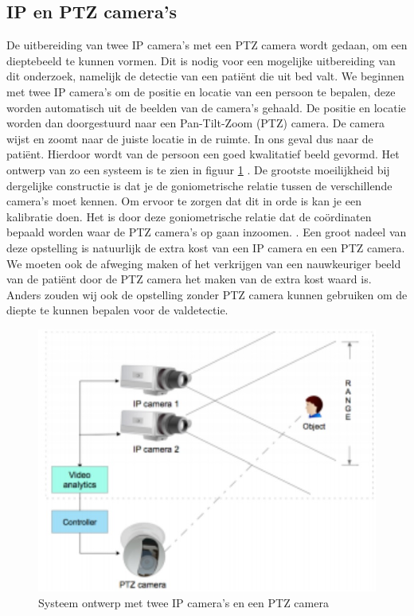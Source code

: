 \subsection{IP en PTZ camera's}
\label{refIPC2}
De uitbereiding van twee IP camera's met een PTZ camera wordt gedaan, om een dieptebeeld te kunnen vormen. Dit is nodig voor een mogelijke uitbereiding van dit onderzoek, namelijk de detectie van een pati\"ent die uit bed valt.  We beginnen met twee IP camera's om de positie en locatie van een persoon te bepalen, deze worden automatisch uit de beelden van de camera's gehaald. De positie en locatie worden dan doorgestuurd naar een Pan-Tilt-Zoom (PTZ) camera. De camera wijst en zoomt naar de juiste locatie in de ruimte. In ons geval dus naar de pati\"ent. Hierdoor wordt van de persoon een goed kwalitatief beeld gevormd. Het ontwerp van zo een systeem is te zien in figuur \ref{imgIPC2} \cite{bibIPC}. De grootste moeilijkheid bij dergelijke constructie is dat je de goniometrische relatie tussen de verschillende camera's moet kennen. Om ervoor te zorgen dat dit in orde is kan je een kalibratie doen. Het is door deze goniometrische relatie dat de co\"ordinaten bepaald worden waar de PTZ camera's op gaan inzoomen. \cite{bibVTC3}. Een groot nadeel van deze opstelling is natuurlijk de extra kost van een IP camera en een PTZ camera. We moeten ook de afweging maken of het verkrijgen van een nauwkeuriger beeld van de pati\"ent door de PTZ camera het maken van de extra kost waard is. Anders zouden wij ook de opstelling zonder PTZ camera kunnen gebruiken om de diepte te kunnen bepalen voor de valdetectie.
\begin{figure}[hbp]
	\includegraphics[scale=0.5]{IPPTZCamera}
	\caption{Systeem ontwerp met twee IP camera's en een PTZ camera}
	\label{imgIPC2}
\end{figure}

